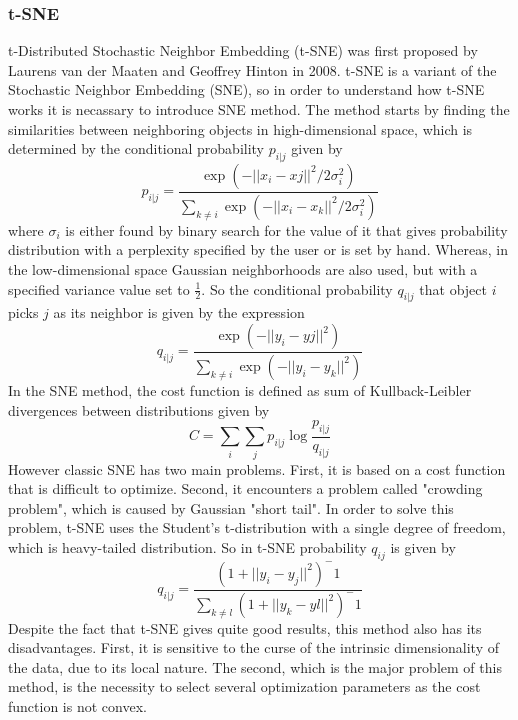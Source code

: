 \documentclass[12pt]{article}
\begin{document}
\subsubsection{t-SNE}
t-Distributed Stochastic Neighbor Embedding (t-SNE) was first proposed by Laurens van der Maaten and Geoffrey Hinton in 2008\cite{vanDerMaaten2008}. t-SNE is a variant of the Stochastic Neighbor Embedding (SNE), so in order to understand how t-SNE works it is necassary to introduce SNE method\cite{HintonRoweis2003}. The method starts by finding the similarities between neighboring objects in high-dimensional space, which is determined by the conditional probability $p_{i|j}$ given by
\begin{equation}
\label{eq:sne_prob_hd}
    p_{i|j}=\frac{\exp(-||x_{i}-x{j}||^{2}/2\sigma_{i}^2)}{\sum_{k\neq i}\exp(-||x_{i}-x_{k}||^2/2\sigma_{i}^2)}
\end{equation}
where $\sigma_{i}$ is either found by binary search for the value of it that gives probability distribution with a perplexity specified by the user or is set by hand. Whereas, in  the low-dimensional space Gaussian neighborhoods are also used, but with a specified variance value set to $\frac{1}{2}$. So the conditional probability $q_{i|j}$ that object $i$ picks $j$ as its neighbor is given by the expression
\begin{equation}
\label{eq:sne_prob_ld}
    q_{i|j}=\frac{\exp(-||y_{i}-y{j}||^{2})}{\sum_{k\neq i}\exp(-||y_{i}-y_{k}||^2)}
\end{equation}
In the SNE method, the cost function is defined as sum of Kullback-Leibler divergences between distributions given by
\begin{equation}
\label{sne_cf}
    C=\sum_{i}\sum_{j}p_{i|j}\log\frac{p_{i|j}}{q_{i|j}}
\end{equation}
However classic SNE has two main problems. First, it is based on a cost function that is difficult to optimize. Second, it encounters a problem called "crowding problem", which is caused by Gaussian "short tail". In order to solve this problem, t-SNE uses the Student's t-distribution with a single degree of freedom, which is heavy-tailed distribution. So in t-SNE probability $q_{ij}$ is given by
\begin{equation}
\label{eq:tsne_prob_ld}
    q_{i|j}=\frac{(1+||y_{i}-y_{j}||^2)^-1}{\sum_{k\neq l}(1+||y_{k}-y{l}||^2)^-1}
\end{equation}
Despite the fact that t-SNE gives quite good results, this method also has its disadvantages. First, it is sensitive to the curse of the intrinsic dimensionality of the data, due to its local nature. The second, which is the major problem of this method, is the necessity to select several optimization parameters as the cost function is not convex.
\end{document}
